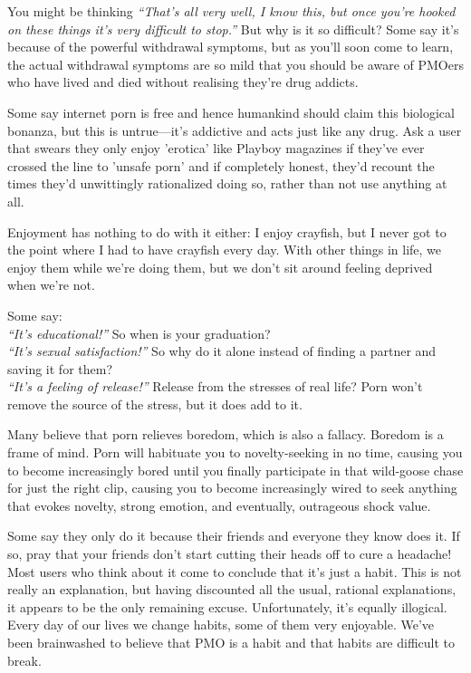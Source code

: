 \documentclass[
]{book}
\begin{document}
You might be thinking \emph{``That's all very well, I know this, but once you're hooked on these things it's very difficult to stop.''} But why is it so difficult? Some say it's because of the powerful withdrawal symptoms, but as you'll soon come to learn, the actual withdrawal symptoms are so mild that you should be aware of PMOers who have lived and died without realising they're drug addicts.

Some say internet porn is free and hence humankind should claim this biological bonanza, but this is untrue---it's addictive and acts just like any drug. Ask a user that swears they only enjoy 'erotica' like Playboy magazines if they've ever crossed the line to 'unsafe porn' and if completely honest, they'd recount the times they'd unwittingly rationalized doing so, rather than not use anything at all.

Enjoyment has nothing to do with it either: I enjoy crayfish, but I never got to the point where I had to have crayfish every day. With other things in life, we enjoy them while we're doing them, but we don't sit around feeling deprived when we're not.

Some say:\\
\emph{``It's educational!''} So when is your graduation?\\
\emph{``It's sexual satisfaction!''} So why do it alone instead of finding a partner and saving it for them?\\
\emph{``It's a feeling of release!''} Release from the stresses of real life? Porn won't remove the source of the stress, but it does add to it.

Many believe that porn relieves boredom, which is also a fallacy. Boredom is a frame of mind. Porn will habituate you to novelty-seeking in no time, causing you to become increasingly bored until you finally participate in that wild-goose chase for just the right clip, causing you to become increasingly wired to seek anything that evokes novelty, strong emotion, and eventually, outrageous shock value.

Some say they only do it because their friends and everyone they know does it. If so, pray that your friends don't start cutting their heads off to cure a headache! Most users who think about it come to conclude that it's just a habit. This is not really an explanation, but having discounted all the usual, rational explanations, it appears to be the only remaining excuse. Unfortunately, it's equally illogical. Every day of our lives we change habits, some of them very enjoyable. We've been brainwashed to believe that PMO is a habit and that habits are difficult to break.
\end{document}
